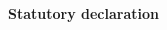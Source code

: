 \documentclass[a4paper,11pt, pagesize]{scrartcl}
\begin{document}
\begin{spacing}{1.2}
\begin{spacing}{1}
\begin{titlepage}
  \end{titlepage}
\end{spacing}
\newpage
\begin{flushleft}
  {\Large \textbf {Statutory declaration }}

\end{flushleft}
\end{spacing}
\end{document}
